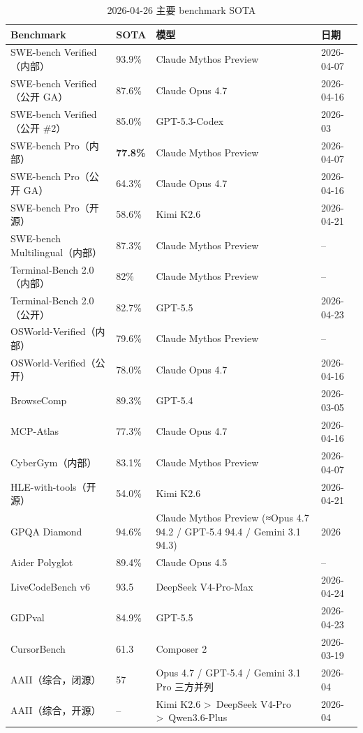 \begin{table}[H]
\centering\small
\renewcommand{\arraystretch}{1.3}
\caption{2026-04-26 主要 benchmark SOTA}\label{tab:sota-2026-04}
\begin{tabularx}{\linewidth}{l l l l}
\toprule
\rowcolor{figLightGray}
\textbf{Benchmark} & \textbf{SOTA} & \textbf{模型} & \textbf{日期} \\
\midrule
SWE-bench Verified（内部） & 93.9\% & Claude Mythos Preview & 2026-04-07 \\
SWE-bench Verified（公开 GA） & 87.6\% & Claude Opus 4.7 & 2026-04-16 \\
SWE-bench Verified（公开 \#2） & 85.0\% & GPT-5.3-Codex & 2026-03 \\
SWE-bench Pro（内部） & \textbf{77.8\%} & Claude Mythos Preview & 2026-04-07 \\
SWE-bench Pro（公开 GA） & 64.3\% & Claude Opus 4.7 & 2026-04-16 \\
SWE-bench Pro（开源） & 58.6\% & Kimi K2.6 & 2026-04-21 \\
SWE-bench Multilingual（内部） & 87.3\% & Claude Mythos Preview & -- \\
Terminal-Bench 2.0（内部） & 82\% & Claude Mythos Preview & -- \\
Terminal-Bench 2.0（公开） & 82.7\% & GPT-5.5 & 2026-04-23 \\
OSWorld-Verified（内部） & 79.6\% & Claude Mythos Preview & -- \\
OSWorld-Verified（公开） & 78.0\% & Claude Opus 4.7 & 2026-04-16 \\
BrowseComp & 89.3\% & GPT-5.4 & 2026-03-05 \\
MCP-Atlas & 77.3\% & Claude Opus 4.7 & 2026-04-16 \\
CyberGym（内部） & 83.1\% & Claude Mythos Preview & 2026-04-07 \\
HLE-with-tools（开源） & 54.0\% & Kimi K2.6 & 2026-04-21 \\
GPQA Diamond & 94.6\% & Claude Mythos Preview (≈Opus 4.7 94.2 / GPT-5.4 94.4 / Gemini 3.1 94.3) & 2026 \\
Aider Polyglot & 89.4\% & Claude Opus 4.5 & -- \\
LiveCodeBench v6 & 93.5 & DeepSeek V4-Pro-Max & 2026-04-24 \\
GDPval & 84.9\% & GPT-5.5 & 2026-04-23 \\
CursorBench & 61.3 & Composer 2 & 2026-03-19 \\
AAII（综合，闭源） & 57 & Opus 4.7 / GPT-5.4 / Gemini 3.1 Pro 三方并列 & 2026-04 \\
AAII（综合，开源） & -- & Kimi K2.6 \textgreater\ DeepSeek V4-Pro \textgreater\ Qwen3.6-Plus & 2026-04 \\
\bottomrule
\end{tabularx}
\end{table}

